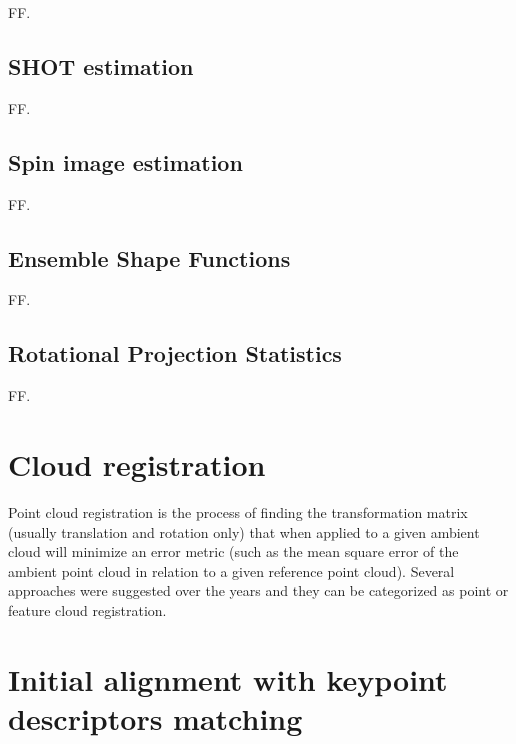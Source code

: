 FF.


\subsection{SHOT estimation}

FF.


\subsection{Spin image estimation}

FF.


\subsection{Ensemble Shape Functions}

FF.


\subsection{Rotational Projection Statistics}

FF.


\section{Cloud registration}

Point cloud registration is the process of finding the transformation matrix (usually translation and rotation only) that when applied to a given ambient cloud will minimize an error metric (such as the mean square error of the ambient point cloud in relation to a given reference point cloud). Several approaches were suggested over the years and they can be categorized as point or feature cloud registration.



\section{Initial alignment with keypoint descriptors matching}

